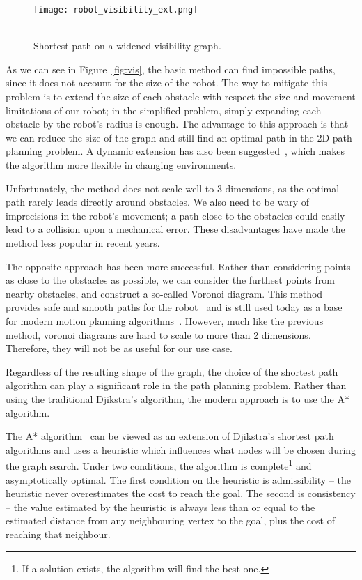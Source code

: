 \begin{wrapfigure}{l}{0.33\textwidth}
    \centering
    \texttt{[image: robot\_visibility\_ext.png]}
  \caption{\\Shortest path on a widened visibility graph.}\label{fig:vis_ext}
\end{wrapfigure}

As we can see in Figure~\ref{fig:vis}, the basic method can find impossible paths, since it does not account for the size of the robot. The way to mitigate this problem is to extend the size of each obstacle with respect the size and movement limitations of our robot; in the simplified problem, simply expanding each obstacle by the robot's radius is enough. The advantage to this approach is that we can reduce the size of the graph and still find an optimal path in the 2D path planning problem. A dynamic extension has also been suggested~\cite{DVG}, which makes the algorithm more flexible in changing environments.

Unfortunately, the method does not scale well to 3 dimensions, as the optimal path rarely leads directly around obstacles. We also need to be wary of imprecisions in the robot's movement; a path close to the obstacles could easily lead to a collision upon a mechanical error. These disadvantages have made the method less popular in recent years.

The opposite approach has been more successful. Rather than considering points as close to the obstacles as possible, we can consider the furthest points from nearby obstacles, and construct a so-called Voronoi diagram. This method provides safe and smooth paths for the robot~\cite{voronoi} and is still used today as a base for modern motion planning algorithms~\cite{voronoi2}. However, much like the previous method, voronoi diagrams are hard to scale to more than 2 dimensions. Therefore, they will not be as useful for our use case.

Regardless of the resulting shape of the graph, the choice of the shortest path algorithm can play a significant role in the path planning problem. Rather than using the traditional Djikstra's algorithm, the modern approach is to use the A* algorithm.

The A* algorithm~\cite{ai_modern} can be viewed as an extension of Djikstra's shortest path algorithms and uses a heuristic which influences what nodes will be chosen during the graph search. Under two conditions, the algorithm is complete\footnote{If a solution exists, the algorithm will find the best one.} and asymptotically optimal. The first condition on the heuristic is admissibility -- the heuristic never overestimates the cost to reach the goal. The second is consistency -- the value estimated by the heuristic is always less than or equal to the estimated distance from any neighbouring vertex to the goal, plus the cost of reaching that neighbour.

